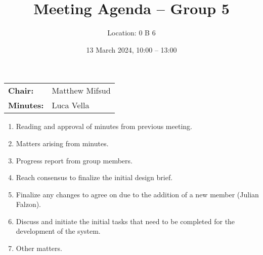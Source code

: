 \documentclass{cce2014-meetings}
\title{Meeting Agenda -- Group 5}
\author{Location: 0 B 6}
\date{13 March 2024, 10:00 -- 13:00}
\begin{document}
\maketitle
\begin{center}
\begin{tabular}{ll}
\textbf{Chair:}   & Matthew Mifsud \\
\textbf{Minutes:} & Luca Vella
\end{tabular}
\end{center}

\begin{enumerate}

\item Reading and approval of minutes from previous meeting.

\item Matters arising from minutes.

\item Progress report from group members.

\item Reach consensus to finalize the initial design brief.

\item Finalize any changes to agree on due to the addition of a new member (Julian Falzon).

\item Discuss and initiate the initial tasks that need to be completed for the development of the system.

\item Other matters.

\end{enumerate}
\end{document}
